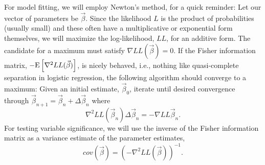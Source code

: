 \documentclass[10pt]{article}
\begin{document}
For model fitting, we will employ Newton's method, for a quick reminder:  Let our vector of parameters be $\vec{\beta}$.
Since the likelihood $L$ is the product of probabilities (usually small) and 
these often have a multiplicative or exponential form themselves, we will maximize the log-likelihood, $LL$, for an additive form.
The candidate for a maximum must satisfy $\nabla LL(\vec{\beta})=0$.  If the Fisher information matrix, $-\text{E}\left[{\nabla^2 LL(\vec{\beta})}\right]$, is 
nicely behaved, i.e., nothing like quasi-complete separation in logistic regression, the following algorithm should converge to a maximum: Given an initial
estimate, $\vec{\beta}_0$, iterate until desired convergence through $\vec{\beta}_{n+1}=\vec{\beta}_n+\Delta\vec{\beta}_n$ where
$$\nabla^2LL(\vec{\beta}_n)\Delta\vec{\beta}_n=-\nabla LL\vec{\beta}_n.$$
For testing variable significance, we will use the inverse of the Fisher information matrix as a variance estimate of the parameter estimates,
$$cov(\vec{\beta})=(-\nabla^2LL(\vec{\beta}))^{-1}.$$
\end{document}
